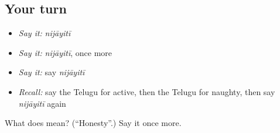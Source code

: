 \subsection*{Your turn}
\begin{itemize}
\raggedright
  \item \emph{Say it:} \emph{nijāyitī}
  \item \emph{Say it:} \emph{nijāyitī}, once more
  \item \emph{Say it:} say \emph{nijāyitī}
  \item \emph{Recall:} say the Telugu for active, then the Telugu for naughty, then say \emph{nijāyitī} again
\end{itemize}

\begin{tcolorbox}[breakable,colback=teal!4,colframe=teal!35!black,title={Before you move on}]
What does  mean? (\textquotedblleft{}Honesty\textquotedblright{}.) Say it once more.
\end{tcolorbox}
